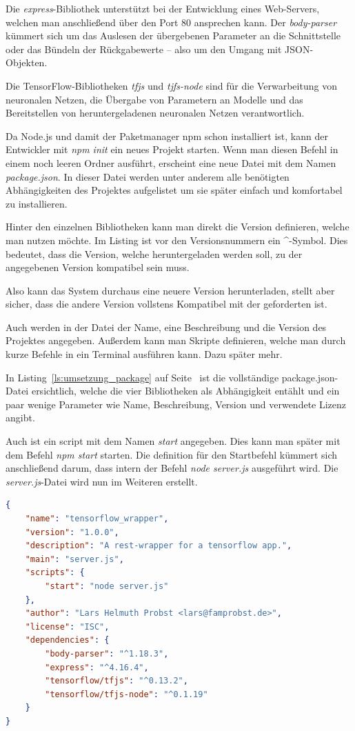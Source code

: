 Die \textit{express}-Bibliothek unterstützt bei der Entwicklung eines Web-Servers, welchen man anschließend über den
Port 80 ansprechen kann. Der \textit{body-parser} kümmert sich um das Auslesen der übergebenen Parameter an die
Schnittstelle oder das Bündeln der Rückgabewerte -- also um den Umgang mit JSON-Objekten.

Die TensorFlow-Bibliotheken \textit{tfjs} und \textit{tjfs-node} sind für die Verwarbeitung von neuronalen Netzen,
die Übergabe von Parametern an Modelle und das Bereitstellen von heruntergeladenen neuronalen Netzen verantwortlich.

Da Node.js und damit der Paketmanager npm schon installiert ist, kann der Entwickler mit \textit{npm init} ein neues 
Projekt starten. Wenn man diesen Befehl in einem noch leeren Ordner ausführt, erscheint eine neue Datei mit dem Namen
\textit{package.json}. In dieser Datei werden unter anderem alle benötigten Abhängigkeiten des Projektes aufgelistet 
um sie später einfach und komfortabel zu installieren.

Hinter den einzelnen Bibliotheken kann man direkt die Version definieren, welche man nutzen möchte. Im Listing ist vor
den Versionsnummern ein \textbf{\^}-Symbol. Dies bedeutet, dass die Version, welche heruntergeladen werden soll, zu der
angegebenen Version kompatibel sein muss.

Also kann das System durchaus eine neuere Version herunterladen, stellt aber sicher, dass die andere Version vollstens
Kompatibel mit der geforderten ist.

Auch werden in der Datei der Name, eine Beschreibung und die Version des Projektes angegeben. Außerdem kann man Skripte
definieren, welche man durch kurze Befehle in ein Terminal ausführen kann. Dazu später mehr.

In Listing~\ref{ls:umsetzung_package} auf Seite~\pageref{ls:umsetzung_package} ist die vollständige package.json-Datei
ersichtlich, welche die vier Bibliotheken als Abhängigkeit entählt und ein paar wenige Parameter wie Name, Beschreibung,
Version und verwendete Lizenz angibt. 

Auch ist ein script mit dem Namen \textit{start} angegeben. Dies kann man später mit dem Befehl \textit{npm start}
starten. Die definition für den Startbefehl kümmert sich anschließend darum, dass intern der Befehl
\textit{node server.js} ausgeführt wird. Die \textit{server.js}-Datei wird nun im Weiteren erstellt.

\begin{lstlisting}[language=JSON, caption=Die komplette package.json, label=ls:umsetzung_package]
{
    "name": "tensorflow_wrapper",
    "version": "1.0.0",
    "description": "A rest-wrapper for a tensorflow app.",
    "main": "server.js",
    "scripts": {
        "start": "node server.js"
    },
    "author": "Lars Helmuth Probst <lars@famprobst.de>",
    "license": "ISC",
    "dependencies": {
        "body-parser": "^1.18.3",
        "express": "^4.16.4",
        "tensorflow/tfjs": "^0.13.2",
        "tensorflow/tfjs-node": "^0.1.19"
    }
}
\end{lstlisting}


